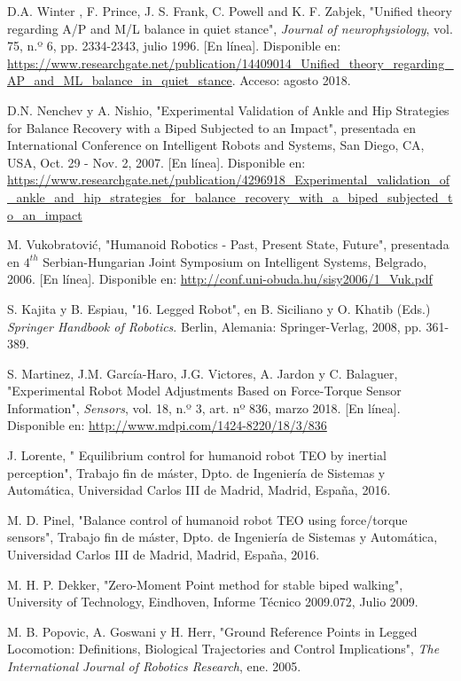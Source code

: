 \begin{thebibliography}{99}
 D.A. Winter , F. Prince, J. S. Frank, C. Powell and K. F. Zabjek, "Unified theory regarding A/P and M/L balance in quiet stance", \textit{Journal of neurophysiology}, vol. 75, n.º 6, pp. 2334-2343, julio 1996. [En línea]. Disponible en: \url{https://www.researchgate.net/publication/14409014_Unified_theory_regarding_AP_and_ML_balance_in_quiet_stance}. Acceso: agosto 2018.

 D.N. Nenchev y A. Nishio, "Experimental Validation of Ankle and Hip Strategies for Balance Recovery with a Biped Subjected to an Impact", presentada en International Conference on Intelligent Robots and Systems, San Diego, CA, USA, Oct. 29 - Nov. 2, 2007. [En línea]. Disponible en: \url{https://www.researchgate.net/publication/4296918_Experimental_validation_of_ankle_and_hip_strategies_for_balance_recovery_with_a_biped_subjected_to_an_impact}

 M. Vukobratović, "Humanoid Robotics - Past, Present State, Future", presentada en $4^{th}$ Serbian-Hungarian Joint Symposium on Intelligent Systems, Belgrado, 2006. [En línea]. Disponible en: \url{http://conf.uni-obuda.hu/sisy2006/1_Vuk.pdf}

 S. Kajita y B. Espiau, "16. Legged Robot", en B. Siciliano y O. Khatib (Eds.) \textit{Springer Handbook of Robotics}. Berlin, Alemania: Springer-Verlag, 2008, pp. 361-389.  

 S. Martinez, J.M. García-Haro, J.G. Victores, A. Jardon y C. Balaguer, "Experimental Robot Model Adjustments Based on Force-Torque Sensor Information", \textit{Sensors}, vol. 18, n.º 3, art. nº 836, marzo 2018. [En línea]. Disponible en: \url{http://www.mdpi.com/1424-8220/18/3/836} 

 J. Lorente, " Equilibrium control for humanoid robot TEO by inertial perception", Trabajo fin de máster, Dpto. de Ingeniería de Sistemas y Automática, Universidad Carlos III de Madrid, Madrid, España, 2016.

 M. D. Pinel, "Balance control of humanoid robot TEO using force/torque sensors", Trabajo fin de máster, Dpto. de Ingeniería de Sistemas y Automática, Universidad Carlos III de Madrid, Madrid, España, 2016.

 M. H. P. Dekker, "Zero-Moment Point method for stable biped walking", University of Technology, Eindhoven, Informe Técnico 2009.072, Julio 2009.

 M. B. Popovic, A. Goswani y H. Herr, "Ground Reference Points in Legged Locomotion: Definitions, Biological Trajectories and Control Implications", \textit{The International Journal of Robotics Research}, ene. 2005. 


\end{thebibliography} 